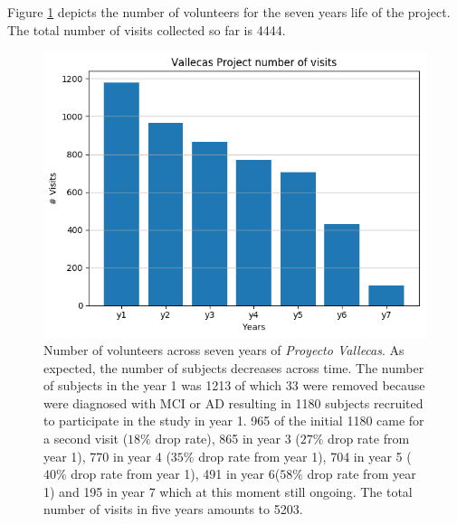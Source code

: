 \documentclass[11pt]{article}
\theoremstyle{definition}
\theoremstyle{remark}
\begin{document}
Figure \ref{fig:pv5years} depicts the number of volunteers for the seven years life of the project. The total number of visits collected so far is 4444. 

\begin{figure}[H]
        \centering
        \includegraphics[keepaspectratio, width=0.6\linewidth]{figures/Fig_visits}
        \caption{Number of volunteers across seven years of \emph{Proyecto Vallecas}. As expected, the number of subjects decreases across time. The number of subjects in the year 1 was 1213 of which 33 were removed because were diagnosed with MCI or AD resulting in 1180 subjects recruited to participate in the study in year 1. 965 of the initial 1180 came for a second visit ($18\%$ drop rate), 865 in year 3 ($27\%$ drop rate from year 1), 770 in year 4 ($35\%$ drop rate from year 1), 704 in year 5 ($40\%$ drop rate from year 1), 491 in year 6($58\%$ drop rate from year 1) and 195 in year 7 which at this moment still ongoing. The total number of visits in five years amounts to 5203.} \label{fig:pv5years}
\end{figure}

\end{document}
